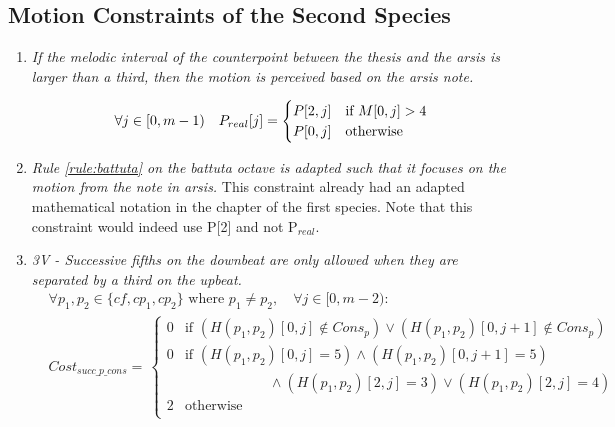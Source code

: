 \subsection*{Motion Constraints of the Second Species}
\begin{enumerate}[wide, label=\bfseries 2.P\arabic*]

\item\label{rule:motion2nd}{\textit{If the melodic interval of the counterpoint between the thesis and the arsis is larger than a third, then the motion is perceived based on the arsis note.}}


\begin{equation}
    \begin{gathered}
        \forall j \in [0, m-1) \quad
        P_{real}[j] = \begin{cases}
            P[2, j] & \text{if } M[0, j] > 4\\
            P[0, j] & \text{otherwise}
        \end{cases}
    \end{gathered}
\end{equation}

\item\label{rule:battuta2}{ \textit{Rule \ref{rule:battuta} on the battuta octave is adapted such that it focuses on the motion from the note in arsis.}}
This constraint already had an adapted mathematical notation in the chapter of the first species. Note that this constraint would indeed use P[2] and not P$_{real}$.


\item \textit{3V - Successive fifths on the downbeat are only allowed when they are separated by a third on the upbeat.}    
    \begin{equation}
        \begin{aligned}
            & \forall p_1, p_2 \in \{cf, cp_1, cp_2\} \text{ where }  p_1 \neq p_2, \quad \forall j \in [0, m-2): \\
            &Cost_{succ\_p\_cons} = \,  
            \begin{cases}
                0 & \text{if } (H(p_1, p_2)[0, j] \notin Cons_p) \lor (H(p_1, p_2)[0, j+1] \notin Cons_p)\\
                0 & \text{if } (H(p_1, p_2)[0, j] = 5 ) \land (H(p_1, p_2)[0, j+1] = 5) \\
                & \quad \quad \quad \quad \quad \quad\land (H(p_1, p_2)[2, j] = 3) \lor (H(p_1, p_2)[2, j] = 4)\\
                2 & \text{otherwise } \\
            \end{cases}\\
        \end{aligned}
    \end{equation}

\end{enumerate}

